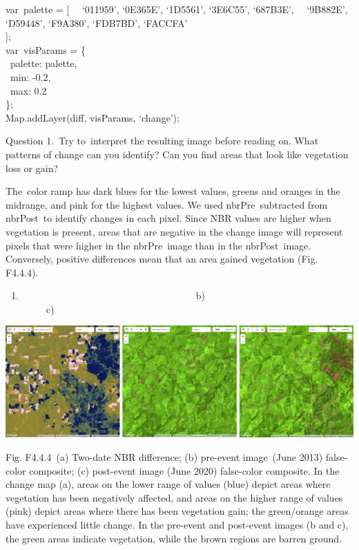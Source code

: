 \documentclass[
  letterpaper,
  DIV=11,
  numbers=noendperiod]{scrreprt}
\providecommand{\tightlist}{%
  \setlength{\itemsep}{0pt}\setlength{\parskip}{0pt}}\usepackage{longtable,booktabs,array}
\begin{document}
var~palette = {[}~ ~`011959', `0E365E', `1D5561', `3E6C55', `687B3E',~
~`9B882E', `D59448', `F9A380', `FDB7BD', `FACCFA'\\
{]};\\
var~visParams = \{\\
\hspace*{0.333em} ~palette: palette,\\
\hspace*{0.333em} ~min: -0.2,\\
\hspace*{0.333em} ~max: 0.2\\
\};\\
Map.addLayer(diff, visParams, `change');

Question 1.~Try to~interpret the resulting image before reading on. What
patterns of change can you identify? Can you find areas that look like
vegetation loss or gain?

The~color ramp has dark blues for the lowest values, greens and oranges
in the midrange, and pink for the highest values. We used
nbrPre~subtracted from nbrPost~to identify changes in each pixel. Since
NBR values are higher when vegetation is present, areas that are
negative in the change image will represent pixels that were higher in
the nbrPre~image than in the nbrPost~image. Conversely, positive
differences mean that an area gained vegetation (Fig. F4.4.4).~

\begin{enumerate}
\def\labelenumi{\alph{enumi})}
\tightlist
\item
  ~ ~ ~ ~ ~ ~ ~ ~ ~ ~ ~ ~ ~ ~ ~ ~ ~ ~ ~ ~ ~ ~b) ~ ~ ~ ~ ~ ~ ~ ~ ~ ~ ~ ~
  ~ ~ ~ ~ ~ ~ ~ ~ ~ c)
\end{enumerate}

\includegraphics{./F4/image4.png}

Fig. F4.4.4~(a) Two-date NBR difference; (b) pre-event image~(June 2013)
false-color composite; (c) post-event image (June 2020) false-color
composite. In the change map (a), areas on the lower range of values
(blue) depict areas where vegetation has been negatively affected, and
areas on the higher range of values (pink) depict areas where there has
been vegetation gain; the green/orange areas have experienced little
change. In the pre-event and post-event images (b and c), the green
areas indicate vegetation, while the brown regions are barren ground.
\end{document}
